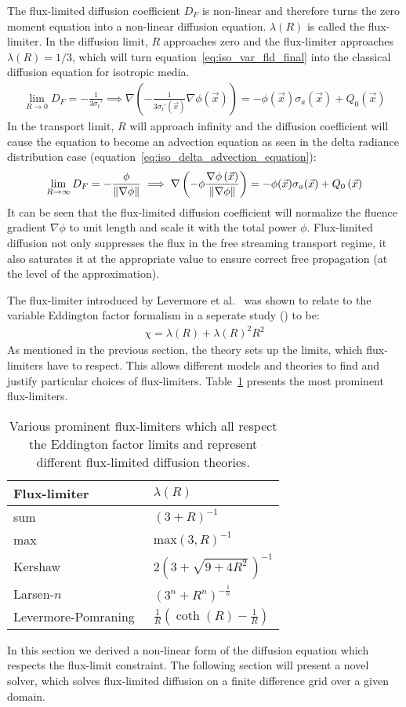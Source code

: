 The flux-limited diffusion coefficient $D_F$ is non-linear and therefore turns the zero moment equation into a non-linear diffusion equation. $\lambda(R)$ is called the flux-limiter. In the diffusion limit, $R$ approaches zero and the flux-limiter approaches $\lambda(R)=1/3$, which will turn equation~\ref{eq:iso_var_fld_final} into the classical diffusion equation for isotropic media.
\begin{align}
\lim_{R\rightarrow 0 }D_F =-\frac{1}{3\sigma_t'}
\implies
\nabla
\left(
-\frac{1}{3\sigma_t'\left(\vec{x}\right)}
\nabla \phi\left(\vec{x}\right)
\right)
=
-\phi(\vec{x})\sigma_a(\vec{x})
+Q_0\left(\vec{x}\right)
\end{align}
In the transport limit, $R$ will approach infinity and the diffusion coefficient will cause the equation to become an advection equation as seen in the delta radiance distribution case (equation~\ref{eq:iso_delta_advection_equation}):
\begin{align}
\lim_{R\rightarrow\infty }D_F =-\frac{\phi}{\left\lVert\nabla\phi\right\rVert}
\implies
\nabla
\left(
-\phi\frac{\nabla\phi\left(\vec{x}\right)}{\left\lVert\nabla\phi\right\rVert}
\right)
=
-\phi(\vec{x})\sigma_a(\vec{x})
+Q_0\left(\vec{x}\right)
\end{align}
It can be seen that the flux-limited diffusion coefficient will normalize the fluence gradient $\nabla\phi$ to unit length and scale it with the total power $\phi$. Flux-limited diffusion not only suppresses the flux in the free streaming transport regime, it also saturates it at the appropriate value to ensure correct free propagation (at the level of the approximation).

The flux-limiter introduced by Levermore et al.~\cite{Levermore81} was shown to relate to the variable Eddington factor formalism in a seperate study (\cite{Whalen82, Levermore84}) to be:
\begin{align}
\label{eq:iso_var_fld_vef}
\chi = \lambda(R) + \lambda(R)^2R^2
\end{align}
As mentioned in the previous section, the theory sets up the limits, which flux-limiters have to respect. This allows different models and theories to find and justify particular choices of flux-limiters. Table~\ref{tbl:flux-limiters} presents the most prominent flux-limiters.
\begin{table}[h]
\center
\caption{Various prominent flux-limiters which all respect the Eddington factor limits and represent different flux-limited diffusion theories.}
\begin{tabular}{ l l }
\hline\hline
 Flux-limiter & $\lambda\left(R\right)$ \\ 
\hline
 sum~\cite{Bowers82} & $(3+R)^{-1}$ \\
 max~\cite{Bowers82} & $\mbox{max}(3, R)^{-1}$ \\
 Kershaw~\cite{Kershaw76} & $2(3+\sqrt{9 + 4R^2}\,)^{-1}$ \\
 Larsen-$n$~\cite{Larsen74} & $(3^n + R^n)^{-\frac{1}{n}}$ \\
 Levermore-Pomraning~\cite{Levermore81} & $\frac{1}{R} \left(\coth(R)-\frac{1}{R}\right)$    
\end{tabular}
\label{tbl:flux-limiters}
\end{table}

In this section we derived a non-linear form of the diffusion equation which respects the flux-limit constraint. The following section will present a novel solver, which solves flux-limited diffusion on a finite difference grid over a given domain.